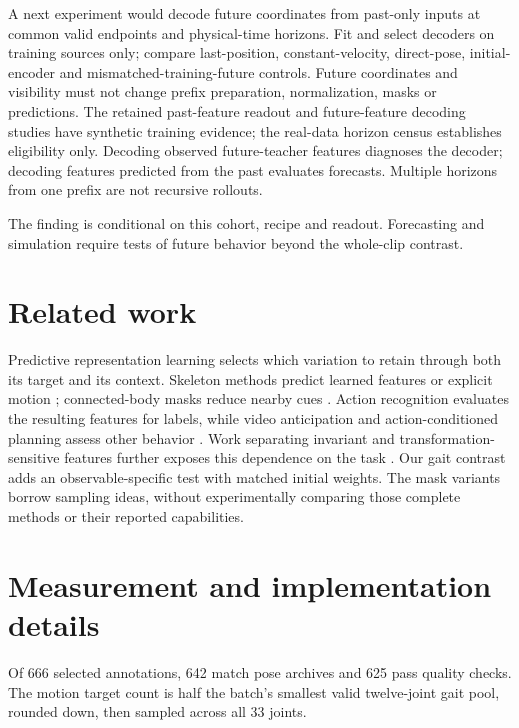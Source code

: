 \documentclass{article}
\begin{document}
A next experiment would decode future coordinates from past-only inputs
at common valid endpoints and physical-time horizons. Fit and select
decoders on training sources only; compare last-position,
constant-velocity, direct-pose, initial-encoder and
mismatched-training-future controls. Future coordinates and visibility
must not change prefix preparation, normalization, masks or predictions.
The retained past-feature readout and future-feature decoding studies
have synthetic training evidence; the real-data horizon census
establishes eligibility only. Decoding observed future-teacher features
diagnoses the decoder; decoding features predicted from the past
evaluates forecasts. Multiple horizons from one prefix are not recursive
rollouts.

The finding is conditional on this cohort, recipe and readout.
Forecasting and simulation require tests of future behavior beyond the
whole-clip contrast.

\section{Related work}\label{related-work}

Predictive representation learning selects which variation to retain
through both its target and its context. Skeleton methods predict
learned features \citep{sjepa} or explicit motion \citep{mamp};
connected-body masks reduce nearby cues \citep{slim}. Action recognition
evaluates the resulting features for labels, while video anticipation
and action-conditioned planning assess other behavior \citep{vjepa2}.
Work separating invariant and transformation-sensitive features further
exposes this dependence on the task \citep{seqjepa}. Our gait contrast
adds an observable-specific test with matched initial weights. The mask
variants borrow sampling ideas, without experimentally comparing those
complete methods or their reported capabilities.

\clearpage


\clearpage
\appendix
\section{Measurement and implementation
details}\label{measurement-and-implementation-details}

Of 666 selected annotations, 642 match pose archives and 625 pass
quality checks. The motion target count is half the batch's smallest
valid twelve-joint gait pool, rounded down, then sampled across all 33
joints.
\end{document}
